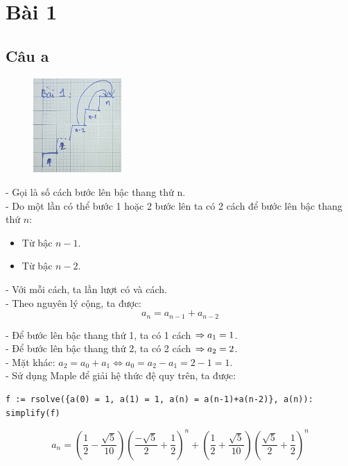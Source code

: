 \documentclass[main.tex]{subfiles}
\begin{document}
\section{Bài 1}

\subsection{Câu a}

\begin{figure}
\centering
\includegraphics[width=0.3\textwidth]{image/Bai1.png}
\end{figure}

- Gọi  là số cách bước lên bậc thang thứ n. \\
- Do một lần có thể bước 1 hoặc 2 bước lên ta có 2 cách để bước lên bậc thang thứ $n$:
\begin{itemize}
    \item Từ bậc $n-1$.
    \item Từ bậc $n-2$.
\end{itemize}

- Với mỗi cách, ta lần lượt có  và  cách.\\
- Theo nguyên lý cộng, ta được:
$$
a_n = a_{n-1} + a_{n-2}
$$

- Để bước lên bậc thang thứ 1, ta có 1 cách $\Rightarrow a_1 = 1$.\\
- Để bước lên bậc thang thứ 2, ta có 2 cách $\Rightarrow a_2 = 2$.\\
- Mặt khác: $a_2 = a_0 + a_1 \Leftrightarrow a_0 = a_2 - a_1 = 2-1 = 1$.\\
- Sử dụng Maple để giải hệ thức đệ quy trên, ta được:
\begin{center}
\begin{verbatim}
f := rsolve({a(0) = 1, a(1) = 1, a(n) = a(n-1)+a(n-2)}, a(n)): simplify(f)
\end{verbatim}
\end{center}
$$
a_n = \left(\frac{1}{2} - \frac{\sqrt{5}}{10}\right)\left(\frac{-\sqrt{5}}{2} + \frac{1}{2}\right)^n + \left(\frac{1}{2} + \frac{\sqrt{5}}{10}\right)\left(\frac{\sqrt{5}}{2} + \frac{1}{2}\right)^n
$$
\end{document}
